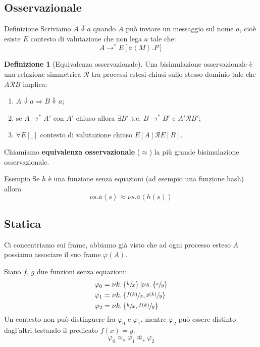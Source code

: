\documentclass{beamer}
\newcounter{counter1}
\theoremstyle{plain}
\theoremstyle{definition}
\newtheorem{mydef}[counter1]{Definizione}
\theoremstyle{remark}
\newcommand{\obar}[1]{\overline{#1}}
\newcommand{\set}[1]{\left\{#1\right\}}
\newcommand{\ang}[1]{\left<#1\right>}
\newcommand{\bra}[1]{\left[#1\right]}
\begin{document}
\subsection{Osservazionale}

\begin{frame}{Definizione}
  Scriviamo $A \Downarrow a$ quando $A$ pu\`o inviare un messaggio sul
  nome $a$, cio\`e esiste $E$ contesto di valutazione che non lega $a$
  tale che:
  \[ A \rightarrow ^* E\bra{ \obar{a}\ang{M}.P} \]

  \begin{mydef}[Equivalenza osservazionale]
    Una bisimulazione osservazionale \`e una relazione simmetrica
    $\mathcal{R}$ tra processi estesi chiusi sullo stesso dominio tale
    che $A \mathcal{R} B$ implica:
    \begin{enumerate}
    \item $A \Downarrow a \Rightarrow B \Downarrow a$;
    \item se $A \rightarrow ^* A'$ con $A'$ chiuso allora $\exists B'$
      t.c. $B \rightarrow ^* B'$ e $A' \mathcal{R} B'$;
    \item $\forall E[\_]$ contesto di valutazione chiuso $E[A]
      \mathcal{R} E[B]$.
    \end{enumerate}
    Chiamiamo \textbf{equivalenza osservazionale} ($\approx$) la pi\`u
    grande bisimulazione osservazionale.
  \end{mydef}
\end{frame}

\begin{frame}{Esempio}
  Se $h$ \`e una funzione senza equazioni (ad esempio una funzione
  hash) allora
  \[ \nu s. \obar{a}\ang{s} \approx \nu s. \obar{a}\ang{h(s)} \]
\end{frame}

\subsection{Statica}

\begin{frame}
  Ci concentriamo sui frame, abbiamo gi\`a visto che ad ogni processo
  esteso $A$ possiamo associare il suo frame $\varphi (A)$.
  \vfill
  
  Siano $f$, $g$ due funzioni senza equazioni:
  \begin{align*}
    \varphi _0 &= \nu k.\set{\sfrac{k}{x}} | \nu s. \set{\sfrac{s}{y}}
    \\
    \varphi _1 &= \nu k.\set{ \sfrac{f(k)}{x}, \sfrac{g(k)}{y}} \\
    \varphi _2 &= \nu k.\set{ \sfrac{k}{x}, \sfrac{f(k)}{y}} 
  \end{align*}
  Un contesto non pu\`o distinguere fra $\varphi _0$ e $\varphi _1$,
  mentre $\varphi _2$ pu\`o essere distinto dagl'altri testando il
  predicato $f(x) = y$.
  \[ \varphi _0 \approx _s \varphi _1 \not \approx _s \varphi _2 \]
\end{frame}
\end{document}
